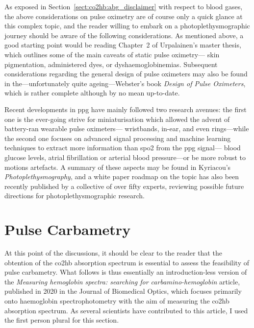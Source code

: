 As exposed in Section~\ref{sect:co2hb:abg_disclaimer} with respect to blood gases, the above considerations on pulse oximetry are of course only a quick glance at this complex topic, and the reader willing to embark on a photoplethysmographic journey should be aware of the following considerations. As mentioned above, a good starting point would be reading Chapter~2 of Urpalainen's master thesis\cite{katja2011}, which outlines some of the main caveats of static pulse oximetry---\eg{} skin pigmentation\cite{shi2022, alhalawani2023}, administered dyes\cite{scheller1986}, or dyshaemoglobinemias\cite{wukitsch1987, ralston1991}. Subsequent considerations regarding the general design of pulse oximeters may also be found in the---unfortunately quite ageing---Webster's book \textit{Design of Pulse Oximeters}\cite{webster1997design}, which is rather complete although by no mean up-to-date.

Recent developments in \gls{ppg} have mainly followed two research avenues:\mfrin{} the first one is the ever-going strive for miniaturisation which allowed the advent of battery-ran wearable pulse oximeters---\eg{} wristbands\cite{jiang2023}, in-ear\cite{azudin2023}, and even rings\cite{boukhayma2021}---while the second one focuses on advanced signal processing and machine learning techniques to extract more information than \gls{spo2} from the \gls{ppg} signal---\eg{} blood glucose levels\cite{tjahjadi2022}, atrial fibrillation\cite{manetasstavrakakis2023} or arterial blood pressure\cite{elhajj2020}---or be more robust to motions artefacts\cite{lee2022}. A summary of these aspects may be found in Kyriacou's \textit{Photoplethysmography}\cite{kyriacou2021photoplethysmography}, and a white paper roadmap on the topic has also been recently published by a collective of over fifty experts, reviewing possible future directions for photoplethysmographic research\cite{charlton2023}.

\section{Pulse Carbametry}\label{sect:co2hb:pulse_carbametry}

At this point of the discussions, it should be clear to the reader that the obtention of the \gls{co2hb} absorption spectrum is essential to assess the feasibility of pulse carbametry. What follows is thus essentially an introduction-less version of the \textit{Measuring hemoglobin spectra: searching for carbamino-hemoglobin} article, published in 2020 in the Journal of Biomedical Optics\cite{dervieux2020}, which focuses primarily onto haemoglobin spectrophotometry with the aim of measuring the \gls{co2hb} absorption spectrum. As several scientists have contributed to this article, I used the first person plural for this section.

